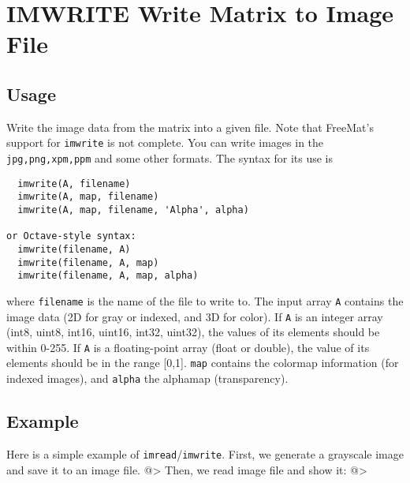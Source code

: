\section{IMWRITE Write Matrix to Image File}

\subsection{Usage}

Write the image data from the matrix into a given file.  Note that
FreeMat's support for \verb|imwrite| is not complete.
You can write images in the \verb|jpg,png,xpm,ppm| and some other formats.
The syntax for its use is
\begin{verbatim}
  imwrite(A, filename)
  imwrite(A, map, filename)
  imwrite(A, map, filename, 'Alpha', alpha)

or Octave-style syntax:
  imwrite(filename, A)
  imwrite(filename, A, map)
  imwrite(filename, A, map, alpha)
\end{verbatim}
where \verb|filename| is the name of the file to write to.  The input array 
\verb|A| contains the image data (2D for gray or indexed, and 3D for color).  
If \verb|A| is an integer array (int8, uint8, int16, uint16, int32, uint32), 
the values of its elements should be within 0-255.  If \verb|A| is a 
floating-point array (float or double), the value of its elements should
be in the range [0,1].  \verb|map| contains the colormap information
(for indexed images), and \verb|alpha| the alphamap (transparency).
\subsection{Example}

Here is a simple example of \verb|imread|/\verb|imwrite|.  First, we generate
a grayscale image and save it to an image file.
@>
Then, we read image file and show it:
@>
